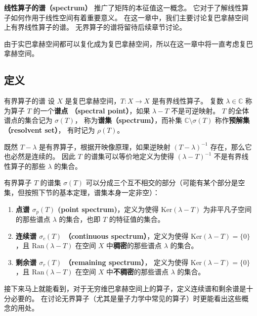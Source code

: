 
\textbf{线性算子的谱（spectrum）} 推广了矩阵的本征值这一概念。 它对于了解线性算子如何作用于线性空间有着重要意义。 在这一章中，我们主要讨论复巴拿赫空间上有界线性算子的谱。 无界算子的谱将留待后续章节讨论。

由于实巴拿赫空间都可以复化成为复巴拿赫空间，所以在这一章中将一直考虑复巴拿赫空间。

\subsection{定义}
\begin{definition}{有界算子的谱}
设 $X$ 是复巴拿赫空间，$T:X\to X$ 是有界线性算子。 复数 $\lambda\in\mathbb{C}$ 称为算子 $T$ 的一个\textbf{谱点 （spectral point）}，如果 $\lambda-T$ 不是可逆映射。 $T$ 的全体谱点的集合记为 $\sigma(T)$， 称为\textbf{谱集（spectrum）}，而补集 $\mathbb{C}\setminus\sigma(T)$ 称作\textbf{预解集（resolvent set）}， 有时记为 $\rho(T)$。
\end{definition}

既然 $T-\lambda$ 是有界算子，根据开映像原理，如果逆映射 $(T-\lambda)^{-1}$ 存在，那么它也必然是连续的。 因此 $T$ 的谱集可以等价地定义为使得 $(\lambda-T)^{-1}$ 不是有界线性算子的那些 $\lambda$ 的集合。

有界算子 $T$ 的谱集 $\sigma(T)$ 可以分成三个互不相交的部分（可能有某个部分是空集，但按照下节的基本定理，谱集本身一定非空）：

\begin{enumerate}
\item \textbf{点谱 $\sigma_p(T)$ (point spectrum)}，定义为使得 $\text{Ker}(\lambda-T)$ 为非平凡子空间的那些谱点 $\lambda$ 的集合，也即 $T$ 的特征值的集合。

\item \textbf{连续谱 $\sigma_c(T)$ （continuous spectrum）}，定义为使得 $\text{Ker}(\lambda-T)=\{0\}$，且 $\text{Ran}(\lambda-T)$ 在空间 $X$ 中\textbf{稠密}的那些谱点 $\lambda$ 的集合。

\item \textbf{剩余谱 $\sigma_r(T)$ （remaining spectrum）}， 定义为使得 $\text{Ker}(\lambda-T)=\{0\}$，且 $\text{Ran}(\lambda-T)$ 在空间 $X$ 中\textbf{不稠密}的那些谱点 $\lambda$ 的集合。
\end{enumerate}

接下来马上就能看到，对于无穷维巴拿赫空间上的算子，定义连续谱和剩余谱是十分必要的。 在讨论无界算子（尤其是量子力学中常见的算子）时更能看出这些概念的用处。

